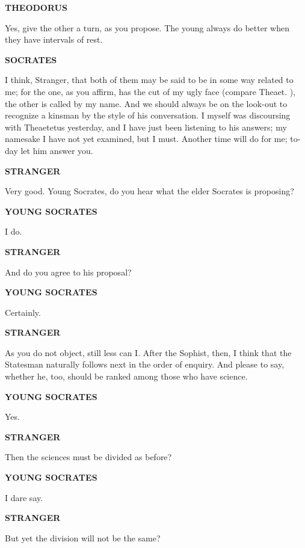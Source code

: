 \documentclass[11pt,letter]{article}
\begin{document}
\par \textbf{THEODORUS}
\par   Yes, give the other a turn, as you propose. The young always do better when they have intervals of rest.

\par \textbf{SOCRATES}
\par   I think, Stranger, that both of them may be said to be in some way related to me; for the one, as you affirm, has the cut of my ugly face (compare Theaet. ), the other is called by my name. And we should always be on the look-out to recognize a kinsman by the style of his conversation. I myself was discoursing with Theaetetus yesterday, and I have just been listening to his answers; my namesake I have not yet examined, but I must. Another time will do for me; to-day let him answer you.

\par \textbf{STRANGER}
\par   Very good. Young Socrates, do you hear what the elder Socrates is proposing?

\par \textbf{YOUNG SOCRATES}
\par   I do.

\par \textbf{STRANGER}
\par   And do you agree to his proposal?

\par \textbf{YOUNG SOCRATES}
\par   Certainly.

\par \textbf{STRANGER}
\par   As you do not object, still less can I. After the Sophist, then, I think that the Statesman naturally follows next in the order of enquiry. And please to say, whether he, too, should be ranked among those who have science.

\par \textbf{YOUNG SOCRATES}
\par   Yes.

\par \textbf{STRANGER}
\par   Then the sciences must be divided as before?

\par \textbf{YOUNG SOCRATES}
\par   I dare say.

\par \textbf{STRANGER}
\par   But yet the division will not be the same?
\end{document}
